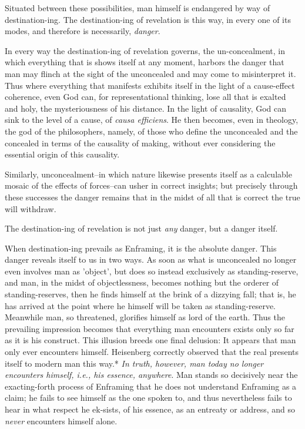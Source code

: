\documentclass[12pt]{article}
\begin{document}
Situated between these possibilities, man himself is endangered by way of destination-ing. The destination-ing of revelation is this way, in every one of its modes, and therefore is necessarily, \textit{danger}.

In every way the destination-ing of revelation governs, the un-concealment, in which everything that is shows itself at any moment, harbors the danger that man may flinch at the sight of the unconcealed and may come to misinterpret it. Thus where everything that manifests exhibits itself in the light of a cause-effect coherence, even God can, for representational thinking, lose all that is exalted and holy, the mysteriousness of his distance. In the light of causality, God can sink to the level of a cause, of \textit{causa efficiens}. He then becomes, even in theology, the god of the philosophers, namely, of those who define the unconcealed and the concealed in terms of the causality of making, without ever considering the essential origin of this causality.

Similarly, unconcealment--in which nature likewise presents itself as a calculable mosaic of the effects of forces--can usher in correct insights; but precisely through these successes the danger remains that in the midst of all that is correct the true will withdraw.

The destination-ing of revelation is not just \textit{any} danger, but a danger itself.

When destination-ing prevails as Enframing, it is the absolute danger. This danger reveals itself to us in two ways. As soon as what is unconcealed no longer even involves man as 'object', but does so instead exclusively as standing-reserve, and man, in the midst of objectlessness, becomes nothing but the orderer of standing-reserves, then he finds himself at the brink of a dizzying fall; that is, he has arrived at the point where he himself will be taken as standing-reserve. Meanwhile man, so threatened, glorifies himself as lord of the earth. Thus the prevailing impression becomes that everything man encounters exists only so far as it is his construct. This illusion breeds one final delusion: It appears that man only ever encounters himself. Heisenberg correctly observed that the real presents itself to modern man this way.* \textit{In truth, however, man today no longer encounters himself, i.e., his essence, anywhere}. Man stands so decisively near the exacting-forth process of Enframing that he does not understand Enframing as a claim; he fails to see himself as the one spoken to, and thus nevertheless fails to hear in what respect he ek-sists, of his essence, as an entreaty or address, and so \textit{never} encounters himself alone.
\end{document}
